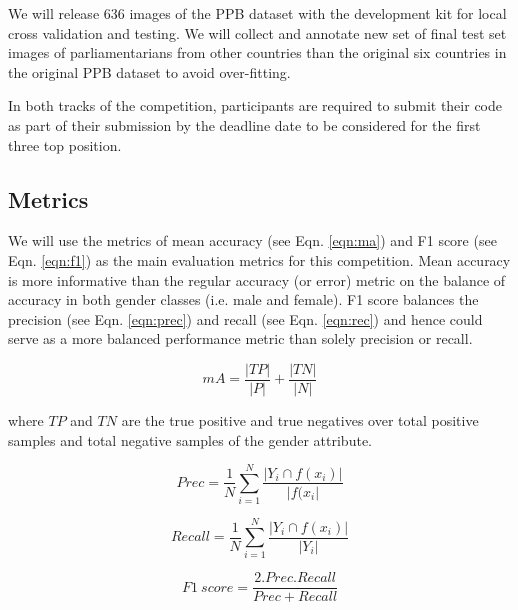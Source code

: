 \documentclass[11pt, oneside]{article}
\begin{document}
We will release 636 images of the PPB dataset with the development kit for 
local cross validation and testing. We will collect and annotate new set of 
final test set images of parliamentarians from other countries than the 
original six countries in the original PPB dataset to avoid over-fitting.

In both tracks of the competition, participants are required to submit their 
code as part of their submission by the deadline date to be considered for the 
first three top position.


\subsection{Metrics}
\label{sec:metrics}
We will use the metrics of mean accuracy (see Eqn. \ref{eqn:ma}) and F1 score (see 
Eqn. \ref{eqn:f1}) as the main evaluation metrics for this competition. Mean 
accuracy is more informative than the regular accuracy (or error) metric on the 
balance of accuracy in both gender classes (i.e. male and 
female). F1 score balances the precision (see Eqn. \ref{eqn:prec}) and recall 
(see Eqn. \ref{eqn:rec}) and hence could serve as a more balanced performance 
metric than solely precision or recall.

\begin{equation}
\label{eqn:ma}
mA =   \frac{|TP|}{|P|} + \frac{|TN|}{|N|}
\end{equation}

where $TP$ and $TN$ are the true positive and true negatives over total 
positive samples and total negative samples of the gender attribute.

\begin{equation}
\label{eqn:prec}
Prec =  \frac{1}{N}  \sum_{i=1}^{N}   \frac{|Y_{i} \cap f(x_{i}) |}{|f(x_{i}|}
\end{equation}

\begin{equation}
\label{eqn:rec}
Recall =  \frac{1}{N}  \sum_{i=1}^{N}   \frac{|Y_{i} \cap f(x_{i}) |}{|Y_{i}|}
\end{equation}

\begin{equation}
\label{eqn:f1}
F1\ score =  \frac{2.Prec.Recall}{Prec+Recall}
\end{equation}
\end{document}
